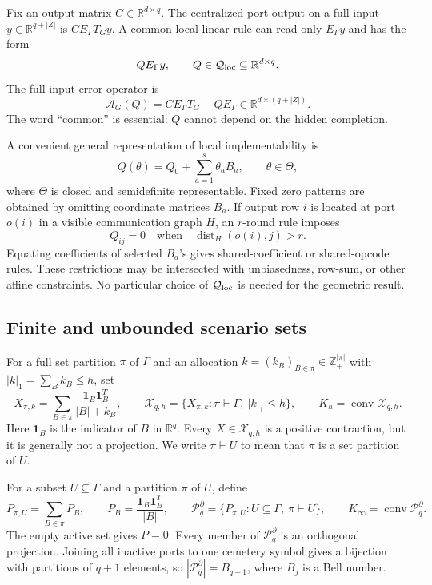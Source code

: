 \documentclass[11pt]{article}
\theoremstyle{definition}
\theoremstyle{remark}
\newcommand{\R}{\mathbb R}
\newcommand{\one}{\mathbf 1}
\newcommand{\conv}{\operatorname{conv}}
\newcommand{\dist}{\operatorname{dist}}
\newcommand{\cX}{\mathcal X}
\newcommand{\cP}{\mathcal P}
\newcommand{\cQ}{\mathcal Q}
\newcommand{\cA}{\mathcal A}
\begin{document}
Fix an output matrix $C\in\R^{d\times q}$.  The centralized port output on a
full input $y\in\R^{q+|Z|}$ is $CE_\Gamma T_Gy$.  A common local linear rule can
read only $E_\Gamma y$ and has the form
\begin{equation}
  Q E_\Gamma y,\qquad Q\in\cQ_{\rm loc}\subseteq\R^{d\times q}.
  \label{eq:local-rule}
\end{equation}
The full-input error operator is
\begin{equation}
  \cA_G(Q)=CE_\Gamma T_G-QE_\Gamma
  \in\R^{d\times(q+|Z|)}.
  \label{eq:full-error}
\end{equation}
The word ``common'' is essential: $Q$ cannot depend on the hidden completion.

A convenient general representation of local implementability is
\begin{equation}
  Q(\theta)=Q_0+\sum_{a=1}^s\theta_aB_a,
  \qquad \theta\in\Theta,
  \label{eq:affine-rule}
\end{equation}
where $\Theta$ is closed and semidefinite representable.  Fixed zero patterns
are obtained by omitting coordinate matrices $B_a$.  If output row $i$ is
located at port $o(i)$ in a visible communication graph $H$, an $r$-round rule
imposes
\[
  Q_{ij}=0\quad\text{when}\quad \dist_H(o(i),j)>r.
\]
Equating coefficients of selected $B_a$'s gives shared-coefficient or
shared-opcode rules.  These restrictions may be intersected with unbiasedness,
row-sum, or other affine constraints.  No particular choice of
$\cQ_{\rm loc}$ is needed for the geometric result.

\subsection{Finite and unbounded scenario sets}

For a full set partition $\pi$ of $\Gamma$ and an allocation
$k=(k_B)_{B\in\pi}\in\mathbb Z_+^{|\pi|}$ with
$|k|_1=\sum_Bk_B\leq h$, set
\begin{equation}
  X_{\pi,k}
  =\sum_{B\in\pi}\frac{\one_B\one_B^T}{|B|+k_B},
  \qquad
  \cX_{q,h}=\{X_{\pi,k}:\pi\vdash\Gamma,\ |k|_1\leq h\},
  \qquad K_h=\conv\cX_{q,h}.
  \label{eq:finite-scenarios}
\end{equation}
Here $\one_B$ is the indicator of $B$ in $\R^q$.  Every
$X\in\cX_{q,h}$ is a positive contraction, but it is generally not a
projection.  We write $\pi\vdash U$ to mean that $\pi$ is a set partition of
$U$.

For a subset $U\subseteq\Gamma$ and a partition $\pi$ of $U$, define
\begin{equation}
  P_{\pi,U}=\sum_{B\in\pi}P_B,
  \qquad P_B=\frac{\one_B\one_B^T}{|B|},
  \qquad
  \cP_q^\partial=\{P_{\pi,U}:U\subseteq\Gamma,\ \pi\vdash U\},
  \qquad K_\infty=\conv\cP_q^\partial .
  \label{eq:partial-scenarios}
\end{equation}
The empty active set gives $P=0$.  Every member of $\cP_q^\partial$ is an
orthogonal projection.  Joining all inactive ports to one cemetery symbol
gives a bijection with partitions of $q+1$ elements, so
$|\cP_q^\partial|=B_{q+1}$, where $B_j$ is a Bell number.
\end{document}
